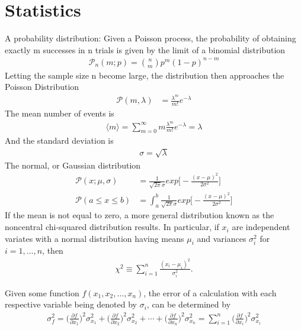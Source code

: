 \chapter{Statistics}
\thispagestyle{fancy}
A probability distribution: Given a Poisson process, the probability of obtaining exactly m successes in n trials is given by the limit of a binomial distribution
\begin{align}
\mathcal{P}_n(m;p)={{n}\choose{m}}p^m(1-p)^{n-m}
\end{align}
Letting the sample size n become large, the distribution then approaches the Poisson Distribution
\begin{align}
\mathcal{P}(m,\lambda) &= \frac{\lambda^m}{m!}e^{-\lambda} 
\end{align}
The mean number of events is
\begin{align}
\langle m\rangle = \sum_{m=0}^{\infty}m \frac{\lambda^m}{m!}e^{-\lambda} = \lambda
\end{align}
And the standard deviation is 
\begin{align}
\sigma = \sqrt{\lambda}
\end{align}
The normal, or Gaussian distribution
\begin{align}
\mathcal{P}(x; \mu, \sigma) &= \frac{1}{\sqrt{2\pi}\sigma}exp\bigg[-\frac{(x-\mu)^2}{2\sigma^2}\bigg] \\
\mathcal{P}(a\leq x \leq b) &= \int_{a}^{b} \frac{1}{\sqrt{2\pi}\sigma}exp\bigg[-\frac{(x-\mu)^2}{2\sigma^2}\bigg] 
\end{align}
If the mean is not equal to zero, a more general distribution known as the noncentral chi-squared distribution results. In particular, if $x_i$ are independent variates with a normal distribution having means $\mu_i$ and variances $\sigma_i^2$ for $i=1, ..., n$, then 
\begin{align}
\chi^2 \equiv \sum_{i=1}^n \frac{(x_i - \mu_i)^2}{\sigma_i^2}.
\end{align}

Given some function $f(x_1, x_2, \dots, x_n)$, the error of a calculation with each respective variable being denoted by $\sigma_i$, can be determined by
\begin{align}
\sigma_f^2= \bigg( \frac{\partial f}{\partial x_1}\bigg)^2\sigma_{x_1}^2+\bigg( \frac{\partial f}{\partial x_2}\bigg)^2\sigma_{x_2}^2 + \cdots +\bigg( \frac{\partial f}{\partial x_n}\bigg)^2\sigma_{x_n}^2 = \sum_{i=1}^{n}\bigg( \frac{\partial f}{\partial x_i}\bigg)^2\sigma_{x_i}^2
\end{align}
